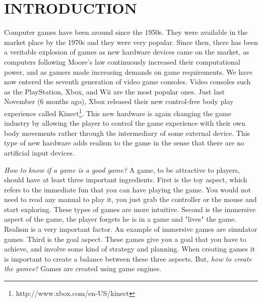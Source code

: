 \chapter{INTRODUCTION}\label{chap1}








Computer games have been around since the 1950s\cite{computerVideoGamesHistory}. They were available in the market place by the 1970s and they were very popular. Since then, there has been a veritable explosion of games as new hardware devices came on the market, as computers following Moore's law continuously increased their computational power, and as gamers made increasing demands on game requirements. We have now entered the seventh generation of video game consoles\cite{seventhGenerationVideoGames}. Video consoles such as the PlayStation, Xbox, and Wii are the most popular ones. Just last November (6 months ago), Xbox released their new control-free body play experience called Kinect\footnote{http://www.xbox.com/en-US/kinect}. This new hardware is again changing the game industry by allowing the player to control the game experience with their own body movements rather through the intermediary of some external device. This type of new hardware adds realism to the game in the sense that there are no artificial input devices.

\textit{How to know if a game is a good game?} A game, to be attractive to players, should have at least three important ingredients\cite{bookGameKit2}. First is the toy aspect, which refers to the immediate fun that you can have playing the game. You would not need to read any manual to play it, you just grab the controller or the mouse and start exploring. These types of games are more intuitive. Second is the immersive aspect of the game, the player forgets he is in a game and "lives" the game. Realism is a very important factor. An example of immersive games are simulator games. Third is the goal aspect. These games give you a goal that you have to achieve, and involve some kind of strategy and planning. When creating games it is important to create a balance between these three aspects. But, \textit{how to create the games?} Games are created using game engines.

